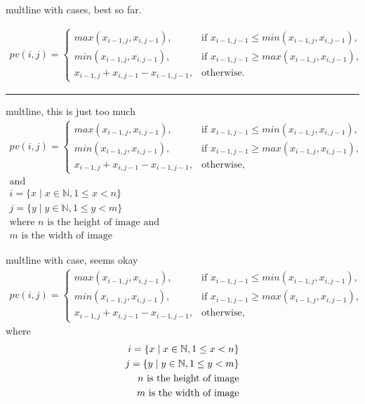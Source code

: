 multline with cases, best so far.

\begin{multline}
	pv(i, j) =  
	\begin{cases}
		max(x_{i - 1, j}, x_{i, j - 1})               , &  \text{if } x_{i - 1, j - 1} \leq min(x_{i - 1, j}, x_{i, j - 1}), \\
		min(x_{i - 1, j}, x_{i, j - 1})               , &  \text{if } x_{i - 1, j - 1} \geq max(x_{i - 1, j}, x_{i, j - 1}), \\
		x_{i - 1, j} + x_{i, j - 1} - x_{i - 1, j - 1}, &  \textrm{otherwise}. 
	\end{cases} 
\end{multline}



\rule{\linewidth}{1px}

multline, this is just too much
\begin{multline}
	pv(i, j) =  
	\begin{cases}
		max(x_{i - 1, j}, x_{i, j - 1})               , &  \text{if } x_{i - 1, j - 1} \leq min(x_{i - 1, j}, x_{i, j - 1}), \\
		min(x_{i - 1, j}, x_{i, j - 1})               , &  \text{if } x_{i - 1, j - 1} \geq max(x_{i - 1, j}, x_{i, j - 1}), \\
		x_{i - 1, j} + x_{i, j - 1} - x_{i - 1, j - 1}, &  \textrm{otherwise}, 
	\end{cases} \\
	\textrm{and } \\
	i = \{x \mid x \in \mathbb{N}, 1 \leq x < n\} \\
	j = \{y \mid y \in \mathbb{N}, 1 \leq y < m\} \\
	\textrm{where } n \text{ is the height of image and} \\
	m \text{ is the width of image} 
\end{multline}

multline with case, seems okay
\begin{multline}
	pv(i, j) =  
	\begin{cases}
		max(x_{i - 1, j}, x_{i, j - 1})               , &  \text{if } x_{i - 1, j - 1} \leq min(x_{i - 1, j}, x_{i, j - 1}), \\
		min(x_{i - 1, j}, x_{i, j - 1})               , &  \text{if } x_{i - 1, j - 1} \geq max(x_{i - 1, j}, x_{i, j - 1}), \\
		x_{i - 1, j} + x_{i, j - 1} - x_{i - 1, j - 1}, &  \textrm{otherwise}, 
	\end{cases} 
\end{multline}
where
\begin{eqnarray}
	i = \{x \mid x \in \mathbb{N}, 1 \leq x < n\} \notag \\
	j = \{y \mid y \in \mathbb{N}, 1 \leq y < m\} \notag \\
	n \text{ is the height of image} \notag \\
	m \text{ is the width of image} \notag
\end{eqnarray}

